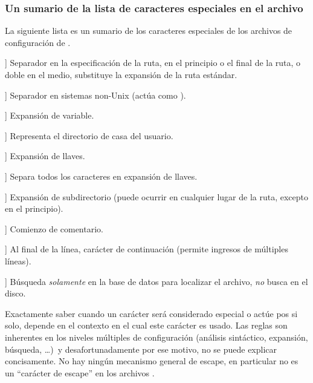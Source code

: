 \documentclass{article}
\begin{document}
\subsubsection{Un sumario de la lista de caracteres especiales en el archivo }
\label{sec:cnf-special-chars}

La siguiente lista es un sumario de los caracteres especiales de los
archivos de configuración de \KPS{}.

\newcommand{\CODE}[1]{\makebox[3em][l]{\code{#1}}}
\begin{ttdescription}
        \item[\CODE{:}] Separador en la especificación de la ruta, en
            el principio o el final de la ruta, o doble en el medio,
		substituye la expansión de la ruta estándar. \par
	\item[\CODE{;}] Separador en sistemas non-Unix (actúa como
		\code{:}).
	\item[\CODE{\$}] Expansión de variable.
        \item[\CODE{\string~}] Representa el directorio de casa del
            usuario.
	\item[\CODE{\char`\{...\char`\}}] Expansión de llaves.
	\item[\CODE{\,}] Separa todos los caracteres en expansión de llaves.
        \item[\CODE{//}] Expansión de subdirectorio (puede ocurrir en
            cualquier lugar de la ruta, excepto en el principio).
	\item[\CODE{\%}] Comienzo de comentario.
	\item[\CODE{\bs}] Al final de la línea, carácter de continuación
		(permite ingresos de múltiples líneas).
	\item[\CODE{!!}] Búsqueda \emph{solamente} en la base de datos
            para localizar el archivo, \emph{no} busca en el disco.
\end{ttdescription}

Exactamente saber cuando un carácter será considerado especial o actúe pos si solo, depende en el contexto en el cual este carácter es usado. Las reglas son inherentes en los niveles múltiples de configuración (análisis sintáctico, expansión, búsqueda, \ldots)\ y desafortunadamente por ese motivo, no se puede explicar concisamente. No hay ningún mecanismo general de escape, en particular \samp{\bs} no es un ``carácter de escape'' en los archivos .
\end{document}
